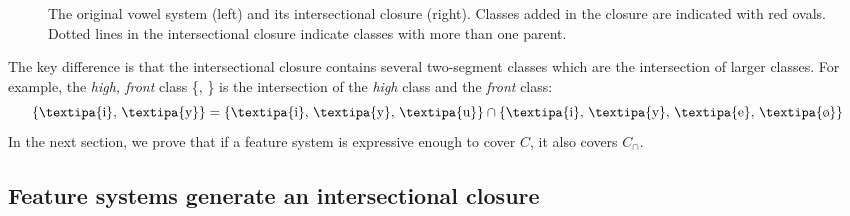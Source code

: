 \documentclass[12pt, oneside]{article}   	%
\begin{document}
\begin{figure}[h]
  \centering
  \qquad
  \caption{The original vowel system (left) and its intersectional closure (right). Classes added in the closure are indicated with red ovals. Dotted lines in the intersectional closure indicate classes with more than one parent.}
  \label{fig:vowel_inventory}
\end{figure}

%

The key difference is that the intersectional closure contains several two-segment classes which are the intersection of larger classes. For example, the \textit{high, front} class \{, \} is the intersection of the \textit{high} class and the \textit{front} class:
$$ \text{\{\textipa{i}, \textipa{y}\}} = \text{\{\textipa{i}, \textipa{y}, \textipa{u}\}} \cap \text{\{\textipa{i}, \textipa{y}, \textipa{e}, \textipa{\o}\}} $$
In the next section, we prove that if a feature system is expressive enough to cover $C$, it also covers $C_\cap$.

\subsection{Feature systems generate an intersectional closure}
\end{document}
